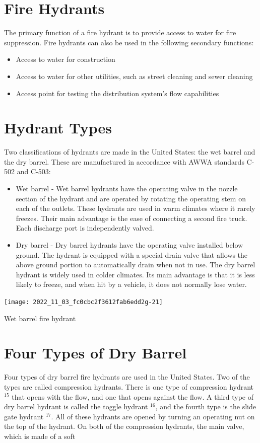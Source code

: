 \documentclass[10pt]{article}
\begin{document}
\section{Fire Hydrants}
The primary function of a fire hydrant is to provide access to water for fire suppression. Fire hydrants can also be used in the following secondary functions:

\begin{itemize}
  \item Access to water for construction

  \item Access to water for other utilities, such as street cleaning and sewer cleaning

  \item Access point for testing the distribution system's flow capabilities

\end{itemize}
\section{Hydrant Types}
Two classifications of hydrants are made in the United States: the wet barrel and the dry barrel. These are manufactured in accordance with AWWA standards C-502 and C-503:

\begin{itemize}
  \item Wet barrel - Wet barrel hydrants have the operating valve in the nozzle section of the hydrant and are operated by rotating the operating stem on each of the outlets. These hydrants are used in warm climates where it rarely freezes. Their main advantage is the ease of connecting a second fire truck. Each discharge port is independently valved.

  \item Dry barrel - Dry barrel hydrants have the operating valve installed below ground. The hydrant is equipped with a special drain valve that allows the above ground portion to automatically drain when not in use. The dry barrel hydrant is widely used in colder climates. Its main advantage is that it is less likely to freeze, and when hit by a vehicle, it does not normally lose water.

\end{itemize}
\texttt{[image: 2022\_11\_03\_fc0cbc2f3612fab6edd2g-21]}

Wet barrel fire hydrant

\section{Four Types of Dry Barrel}
Four types of dry barrel fire hydrants are used in the United States. Two of the types are called compression hydrants. There is one type of compression hydrant ${ }^{15}$ that opens with the flow, and one that opens against the flow. A third type of dry barrel hydrant is called the toggle hydrant ${ }^{16}$, and the fourth type is the slide gate hydrant ${ }^{17}$. All of these hydrants are opened by turning an operating nut on the top of the hydrant. On both of the compression hydrants, the main valve, which is made of a soft
\end{document}
